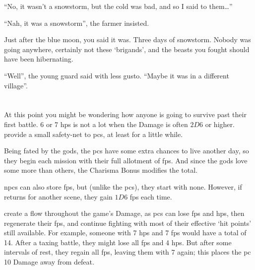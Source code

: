 \begin{multicols}{2}
\begin{exampletext}
  ``No, it wasn't a snowstorm, but the cold was bad, and so I said to them\ldots''

  ``Nah, it was a snowstorm'', the farmer insisted.

  Just after the blue moon, you said it was.
  Three days of snowstorm.
  Nobody was going anywhere, certainly not these `brigands', and the beasts you fought should have been hibernating.

  ``Well'', the young guard said with less gusto.
  ``Maybe it was in a different village''.

\end{exampletext}

\end{multicols}

\section{}
\label{fate_points}

\begin{multicols}{2}

\noindent
At this point you might be wondering how anyone is going to survive past their first battle.
6 or 7 \glspl{hp} is not a lot when the Damage is often $2D6$ or higher.
 provide a small safety-net to \glspl{pc}, at least for a little while.



Being fated by the gods, the \glspl{pc} have some extra chances to live another day, so they begin each mission with their full allotment of \glspl{fp}.
And since the gods love some more than others, the Charisma Bonus modifies the total.

\Glspl{npc} can also store \glspl{fp}, but (unlike the \glspl{pc}), they start with none.
However, if  returns for another scene, they gain $1D6$ \glspl{fp} each time.%

 create a flow throughout the game's Damage, as \glspl{pc} can lose \glspl{fp} and \glspl{hp}, then regenerate their \glspl{fp}, and continue fighting with most of their effective `hit points' still available.
For example, someone with 7 \glspl{hp} and 7 \glspl{fp} would have a total of 14.
After a taxing battle, they might lose all \glspl{fp} and 4 \glspl{hp}.
But after some \glspl{interval} of rest, they regain all \glspl{fp}, leaving them with 7 again; this places the \gls{pc} 10 Damage away from defeat.

\end{multicols}

